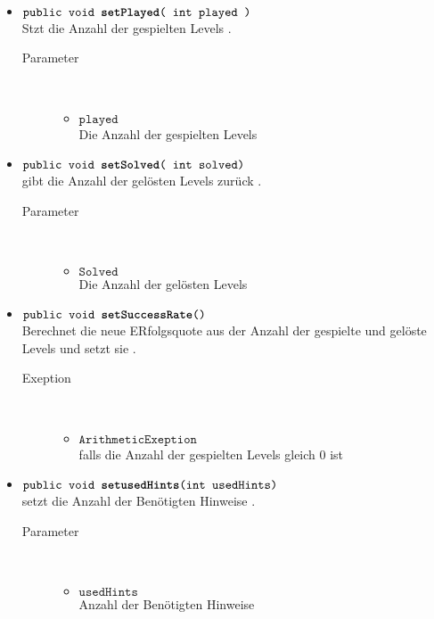 \begin{description}
\begin{itemize}
\item $\texttt{public  void \textbf{setPlayed}( int played )}$ \\ Stzt die Anzahl der gespielten Levels  .
				\begin{description}
				\item[Parameter] \hfill \\
					\vspace{-.8cm}
					\begin{itemize}
						\item $\texttt{played }$ \\Die Anzahl der gespielten Levels
					\end{itemize}	
					\end{description}
					\item $\texttt{public  void  \textbf{setSolved}( int solved)}$ \\ gibt die Anzahl der gelösten Levels zurück .
				\begin{description}
				\item[Parameter] \hfill \\
					\vspace{-.8cm}
					\begin{itemize}
						\item $\texttt{Solved }$ \\Die Anzahl der gelösten Levels
					\end{itemize}	
					\end{description}
			
			
			\item $\texttt{public  void \textbf{setSuccessRate}()}$ \\ Berechnet die neue  ERfolgsquote aus der Anzahl der  gespielte und gelöste Levels und setzt sie  .
				\begin{description}
				\item[Exeption] \hfill \\
					\vspace{-.8cm}
					\begin{itemize}
						\item $\texttt{ArithmeticExeption }$ \\falls die Anzahl der gespielten Levels gleich 0 ist
					\end{itemize}	
					\end{description}
			
\item $\texttt{public  void \textbf{setusedHints}(int usedHints)}$ \\ setzt die Anzahl der Benötigten Hinweise  .
				\begin{description}
				\item[Parameter] \hfill \\
					\vspace{-.8cm}
					\begin{itemize}
						\item $\texttt{usedHints }$ \\Anzahl der Benötigten Hinweise
					\end{itemize}	
					\end{description}					
				

\end{itemize}
\end{description}
